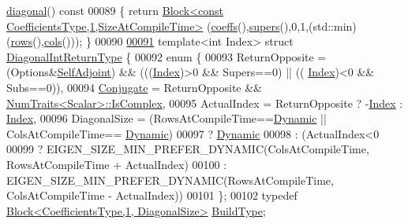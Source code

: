 \begin{DoxyCode}
       \hyperlink{class_eigen_1_1internal_1_1_band_matrix_base_a7c55438da88b00d29f8f514bddfa86ba}{diagonal}()\textcolor{keyword}{ const}
00089 \textcolor{keyword}{    }\{ \textcolor{keywordflow}{return} \hyperlink{group___core___module_class_eigen_1_1_block}{Block<const CoefficientsType,1,SizeAtCompileTime>}
      (\hyperlink{class_eigen_1_1internal_1_1_band_matrix_base_ab7c9e9a7ca5ad0f2f3a82ac582650499}{coeffs}(),\hyperlink{class_eigen_1_1internal_1_1_band_matrix_base_a58617da0d75d22b1f8dfdfde702ebb4a}{supers}(),0,1,(std::min)(\hyperlink{group___core___module_a8141320ba8df384426c298b32b000d8e}{rows}(),\hyperlink{group___core___module_a7b0b45c7351847696c911ce8aa2abbdb}{cols}())); \}
00090 
\hyperlink{struct_eigen_1_1internal_1_1_band_matrix_base_1_1_diagonal_int_return_type}{00091}     \textcolor{keyword}{template}<\textcolor{keywordtype}{int} Index> \textcolor{keyword}{struct }\hyperlink{struct_eigen_1_1internal_1_1_band_matrix_base_1_1_diagonal_int_return_type}{DiagonalIntReturnType} \{
00092       \textcolor{keyword}{enum} \{
00093         ReturnOpposite = (Options&\hyperlink{group__enums_gga39e3366ff5554d731e7dc8bb642f83cda2491fc6765056421f504eb7e16083e8f}{SelfAdjoint}) && (((\hyperlink{group___core___module_a554f30542cc2316add4b1ea0a492ff02}{Index})>0 && Supers==0) || ((
      \hyperlink{group___core___module_a554f30542cc2316add4b1ea0a492ff02}{Index})<0 && Subs==0)),
00094         \hyperlink{class_eigen_1_1_conjugate}{Conjugate} = ReturnOpposite && \hyperlink{group___core___module_struct_eigen_1_1_num_traits}{NumTraits<Scalar>::IsComplex},
00095         ActualIndex = ReturnOpposite ? -\hyperlink{group___core___module_a554f30542cc2316add4b1ea0a492ff02}{Index} : \hyperlink{group___core___module_a554f30542cc2316add4b1ea0a492ff02}{Index},
00096         DiagonalSize = (RowsAtCompileTime==\hyperlink{namespace_eigen_ad81fa7195215a0ce30017dfac309f0b2}{Dynamic} || ColsAtCompileTime==
      \hyperlink{namespace_eigen_ad81fa7195215a0ce30017dfac309f0b2}{Dynamic})
00097                      ? \hyperlink{namespace_eigen_ad81fa7195215a0ce30017dfac309f0b2}{Dynamic}
00098                      : (ActualIndex<0
00099                      ? EIGEN\_SIZE\_MIN\_PREFER\_DYNAMIC(ColsAtCompileTime, RowsAtCompileTime + ActualIndex)
00100                      : EIGEN\_SIZE\_MIN\_PREFER\_DYNAMIC(RowsAtCompileTime, ColsAtCompileTime - ActualIndex))
00101       \};
00102       \textcolor{keyword}{typedef} \hyperlink{group___core___module_class_eigen_1_1_block}{Block<CoefficientsType,1, DiagonalSize>} 
      \hyperlink{group___core___module_class_eigen_1_1_block}{BuildType};

\end{DoxyCode}
